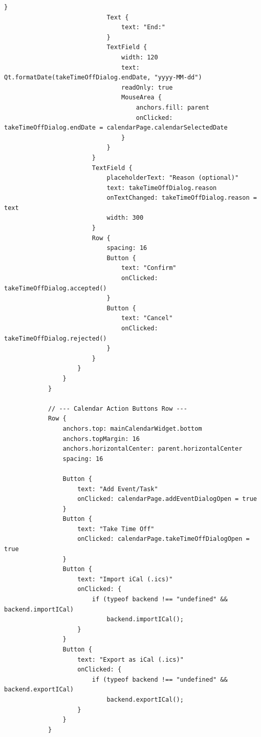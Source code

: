 \documentclass{report}
\begin{document}
\begin{lstlisting}[style=qmlstyle]
                            }
                            Text {
                                text: "End:"
                            }
                            TextField {
                                width: 120
                                text: Qt.formatDate(takeTimeOffDialog.endDate, "yyyy-MM-dd")
                                readOnly: true
                                MouseArea {
                                    anchors.fill: parent
                                    onClicked: takeTimeOffDialog.endDate = calendarPage.calendarSelectedDate
                                }
                            }
                        }
                        TextField {
                            placeholderText: "Reason (optional)"
                            text: takeTimeOffDialog.reason
                            onTextChanged: takeTimeOffDialog.reason = text
                            width: 300
                        }
                        Row {
                            spacing: 16
                            Button {
                                text: "Confirm"
                                onClicked: takeTimeOffDialog.accepted()
                            }
                            Button {
                                text: "Cancel"
                                onClicked: takeTimeOffDialog.rejected()
                            }
                        }
                    }
                }
            }

            // --- Calendar Action Buttons Row ---
            Row {
                anchors.top: mainCalendarWidget.bottom
                anchors.topMargin: 16
                anchors.horizontalCenter: parent.horizontalCenter
                spacing: 16

                Button {
                    text: "Add Event/Task"
                    onClicked: calendarPage.addEventDialogOpen = true
                }
                Button {
                    text: "Take Time Off"
                    onClicked: calendarPage.takeTimeOffDialogOpen = true
                }
                Button {
                    text: "Import iCal (.ics)"
                    onClicked: {
                        if (typeof backend !== "undefined" && backend.importICal)
                            backend.importICal();
                    }
                }
                Button {
                    text: "Export as iCal (.ics)"
                    onClicked: {
                        if (typeof backend !== "undefined" && backend.exportICal)
                            backend.exportICal();
                    }
                }
            }


\end{lstlisting}
\end{document}
